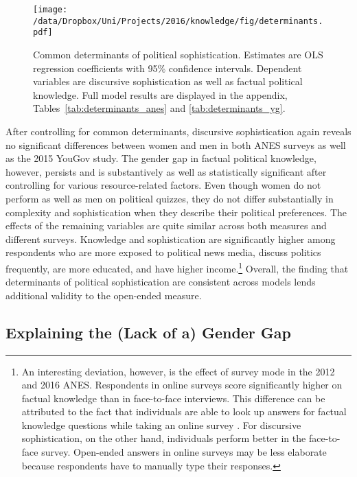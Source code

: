 \begin{figure}[h]\centering
\texttt{[image: /data/Dropbox/Uni/Projects/2016/knowledge/fig/determinants.pdf]}
\caption[Common determinants of political sophistication]{Common determinants of political sophistication. Estimates are OLS regression coefficients with 95\% confidence intervals. Dependent variables are discursive sophistication as well as factual political knowledge. Full model results are displayed in the appendix, Tables~\ref{tab:determinants_anes} and \ref{tab:determinants_yg}.}\label{fig:determinants}
\end{figure}

After controlling for common determinants, discursive sophistication again reveals no significant differences between women and men in both ANES surveys as well as the 2015 YouGov study. The gender gap in factual political knowledge, however, persists and is substantively as well as statistically significant after controlling for various resource-related factors. Even though women do not perform as well as men on political quizzes, they do not differ substantially in complexity and sophistication when they describe their political preferences. The effects of the remaining variables are quite similar across both measures and different surveys. Knowledge and sophistication are significantly higher among respondents who are more exposed to political news media, discuss politics frequently, are more educated, and have higher income.\footnote{An interesting deviation, however, is the effect of survey mode in the 2012 and 2016 ANES. Respondents in online surveys score significantly higher on factual knowledge than in face-to-face interviews. This difference can be attributed to the fact that individuals are able to look up answers for factual knowledge questions while taking an online survey \citep[cf.][]{clifford2016cheating}. For discursive sophistication, on the other hand, individuals perform better in the face-to-face survey. Open-ended answers in online surveys may be less elaborate because respondents have to manually type their responses.} Overall, the finding that determinants of political sophistication are consistent across models lends additional validity to the open-ended measure.


\subsection*{Explaining the (Lack of a) Gender Gap}

